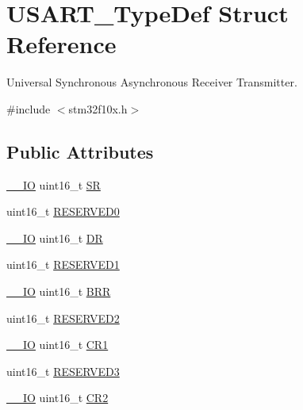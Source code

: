 \hypertarget{struct_u_s_a_r_t___type_def}{}\section{U\+S\+A\+R\+T\+\_\+\+Type\+Def Struct Reference}
\label{struct_u_s_a_r_t___type_def}


Universal Synchronous Asynchronous Receiver Transmitter.  




{\ttfamily \#include $<$stm32f10x.\+h$>$}

\subsection*{Public Attributes}
\begin{DoxyCompactItemize}
\item 
\hyperlink{core__sc300_8h_aec43007d9998a0a0e01faede4133d6be}{\+\_\+\+\_\+\+IO} uint16\+\_\+t \hyperlink{struct_u_s_a_r_t___type_def_a3f1fd9f0c004d3087caeba4815faa41c}{SR}
\item 
uint16\+\_\+t \hyperlink{struct_u_s_a_r_t___type_def_a84ccd64c74c8dbc78b94172ce759de10}{R\+E\+S\+E\+R\+V\+E\+D0}
\item 
\hyperlink{core__sc300_8h_aec43007d9998a0a0e01faede4133d6be}{\+\_\+\+\_\+\+IO} uint16\+\_\+t \hyperlink{struct_u_s_a_r_t___type_def_accee34aaec89aad4aeef512bba173ae5}{DR}
\item 
uint16\+\_\+t \hyperlink{struct_u_s_a_r_t___type_def_a6d78680272a465db0ee43eba4e9c54f3}{R\+E\+S\+E\+R\+V\+E\+D1}
\item 
\hyperlink{core__sc300_8h_aec43007d9998a0a0e01faede4133d6be}{\+\_\+\+\_\+\+IO} uint16\+\_\+t \hyperlink{struct_u_s_a_r_t___type_def_a2044eb2a0a8a731400d309741bceb2f7}{B\+RR}
\item 
uint16\+\_\+t \hyperlink{struct_u_s_a_r_t___type_def_af2b7924854e56d0ebd3e8699dfd0e369}{R\+E\+S\+E\+R\+V\+E\+D2}
\item 
\hyperlink{core__sc300_8h_aec43007d9998a0a0e01faede4133d6be}{\+\_\+\+\_\+\+IO} uint16\+\_\+t \hyperlink{struct_u_s_a_r_t___type_def_a5de50313b1437f7f926093f00902d37a}{C\+R1}
\item 
uint16\+\_\+t \hyperlink{struct_u_s_a_r_t___type_def_a158066c974911c14efd7ea492ea31137}{R\+E\+S\+E\+R\+V\+E\+D3}
\item 
\hyperlink{core__sc300_8h_aec43007d9998a0a0e01faede4133d6be}{\+\_\+\+\_\+\+IO} uint16\+\_\+t \hyperlink{struct_u_s_a_r_t___type_def_a2a494156d185762e4596696796c393bc}{C\+R2}

\end{DoxyCompactItemize}
